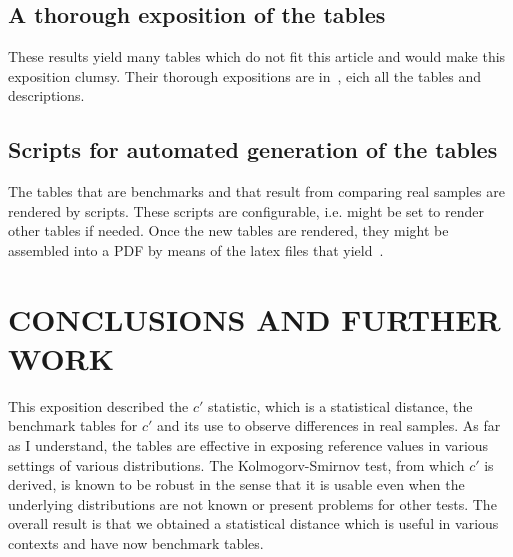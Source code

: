 \documentclass[12pt,fleqn]{article}
\begin{document}
\subsection{A thorough exposition of the tables}
These results yield many tables which do not fit this article and would make
this exposition clumsy.
Their thorough expositions are in~\cite{ksstats},
eich all the tables and descriptions.

\subsection{Scripts for automated generation of the tables}
The tables that are benchmarks and that result from comparing real samples
are rendered by scripts.
These scripts are configurable, i.e. might be set to render other tables if needed.
Once the new tables are rendered, they might be assembled into a PDF by means
of the latex files that yield~\cite{ksstats}.

\section{CONCLUSIONS AND FURTHER WORK}\label{sec:conc}
This exposition described the $c'$ statistic, which is a statistical distance,
the benchmark tables for $c'$ and its use to observe differences in real samples.
As far as I understand, the tables are effective in exposing reference
values in various settings of various distributions.
The Kolmogorv-Smirnov test, from which $c'$ is derived, is known
to be robust in the sense that it is usable even when the underlying distributions
are not known or present problems for other tests.
The overall result is that we obtained a statistical distance which is
useful in various contexts and have now benchmark tables.
\end{document}

